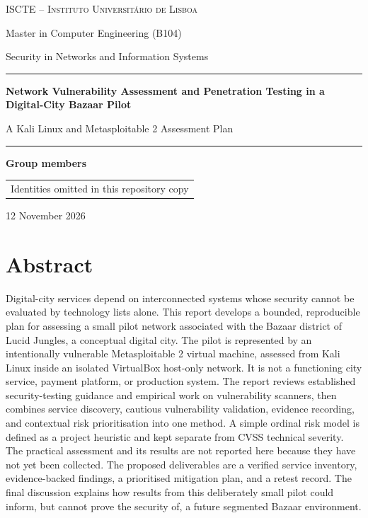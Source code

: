 \documentclass[11pt,a4paper]{article}
\newcommand{\reporttitle}{Network Vulnerability Assessment and Penetration Testing in a Digital-City Bazaar Pilot}
\begin{document}
\hypersetup{pageanchor=false}
\begin{titlepage}
\centering
\vspace*{1.3cm}
{\Large\textsc{ISCTE -- Instituto Universit\'ario de Lisboa}\par}
\vspace{0.6cm}
{\large Master in Computer Engineering (B104)\par}
{\large Security in Networks and Information Systems\par}
\vspace{2.1cm}
{\color{iscteblue}\rule{\textwidth}{1.2pt}\par}
\vspace{0.55cm}
{\LARGE\bfseries \reporttitle\par}
\vspace{0.45cm}
{\Large A Kali Linux and Metasploitable 2 Assessment Plan\par}
\vspace{0.55cm}
{\color{iscteblue}\rule{\textwidth}{1.2pt}\par}
\vspace{1.7cm}
{\large\textbf{Group members}\par}
\vspace{0.35cm}
\begin{tabular}{c}
Identities omitted in this repository copy
\end{tabular}
\vfill
\vspace{0.4cm}
{\large 12 November 2026\par}
\end{titlepage}

\hypersetup{pageanchor=true}
\section*{Abstract}
Digital-city services depend on interconnected systems whose security cannot be evaluated by technology lists alone. This report develops a bounded, reproducible plan for assessing a small pilot network associated with the Bazaar district of Lucid Jungles, a conceptual digital city. The pilot is represented by an intentionally vulnerable Metasploitable 2 virtual machine, assessed from Kali Linux inside an isolated VirtualBox host-only network. It is not a functioning city service, payment platform, or production system. The report reviews established security-testing guidance and empirical work on vulnerability scanners, then combines service discovery, cautious vulnerability validation, evidence recording, and contextual risk prioritisation into one method. A simple ordinal risk model is defined as a project heuristic and kept separate from CVSS technical severity. The practical assessment and its results are not reported here because they have not yet been collected. The proposed deliverables are a verified service inventory, evidence-backed findings, a prioritised mitigation plan, and a retest record. The final discussion explains how results from this deliberately small pilot could inform, but cannot prove the security of, a future segmented Bazaar environment.
\end{document}
